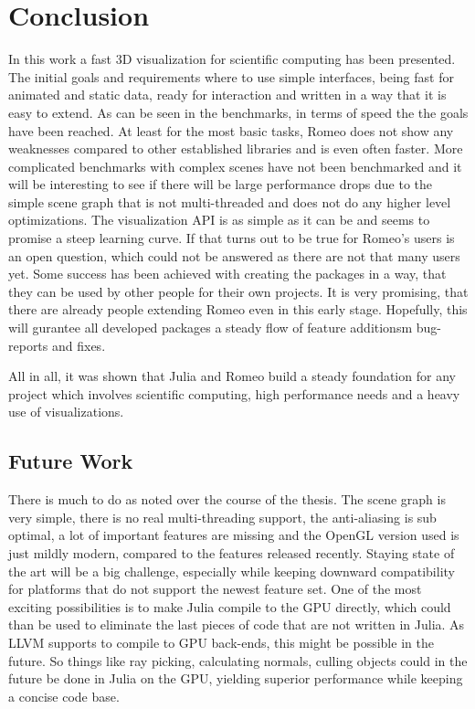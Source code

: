 \section{Conclusion}
In this work a fast 3D visualization for scientific computing has been presented. 
The initial goals and requirements where to use simple interfaces, being fast for animated and static data, ready for interaction and written in a way that it is easy to extend.
As can be seen in the benchmarks, in terms of speed the the goals have been reached. At least for the most basic tasks, Romeo does not show any weaknesses compared to other established libraries and is even often faster.
More complicated benchmarks with complex scenes have not been benchmarked and it will be interesting to see if there will be large performance drops due to the simple scene graph that is not multi-threaded and does not do any higher level optimizations.
The visualization API is as simple as it can be and seems to promise a steep learning curve.
If that turns out to be true for Romeo's users is an open question, which could not be answered as there are not that many users yet.
Some success has been achieved with creating the packages in a way, that they can be used by other people for their own projects. 
It is very promising, that there are already people extending Romeo even in this early stage.
Hopefully, this will gurantee all developed packages a steady flow of feature additionsm bug-reports and fixes. 

All in all, it was shown that Julia and Romeo build a steady foundation for any project which involves scientific computing, high performance needs and a heavy use of visualizations. 

\subsection{Future Work}

There is much to do as noted over the course of the thesis. The scene graph is very simple, there is no real multi-threading support, the anti-aliasing is sub optimal, a lot of important features are missing and the OpenGL version used is just mildly modern, compared to the features released recently. 
Staying state of the art will be a big challenge, especially while keeping downward compatibility for platforms that do not support the newest feature set.
One of the most exciting possibilities is to make Julia compile to the GPU directly, which could than be used to eliminate the last pieces of code that are not written in Julia. 
As \ac{LLVM} supports to compile to GPU back-ends, this might be possible in the future.
So things like ray picking, calculating normals, culling objects could in the future be done in Julia on the GPU, yielding superior performance while keeping a concise code base.